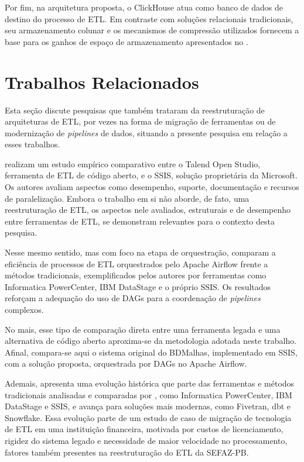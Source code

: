 Por fim, na arquitetura proposta, o ClickHouse atua como banco de dados de destino do processo de
ETL. Em contraste com soluções relacionais tradicionais, seu armazenamento colunar e os mecanismos
de compressão utilizados fornecem a base para os ganhos de espaço de armazenamento apresentados no
.

\section{Trabalhos Relacionados}

Esta seção discute pesquisas que também trataram da reestruturação de arquiteturas de ETL,
por vezes na forma de migração de ferramentas ou de modernização de \textit{pipelines} de
dados, situando a presente pesquisa em relação a esses trabalhos.

 realizam um estudo empírico comparativo entre o Talend Open
Studio, ferramenta de ETL de código aberto, e o SSIS, solução proprietária da Microsoft. Os
autores avaliam aspectos como desempenho, suporte, documentação e recursos de paralelização.
Embora o trabalho em si não aborde, de fato, uma reestruturação de ETL, os aspectos nele
avaliados, estruturais e de desempenho entre ferramentas de ETL, se demonstram relevantes para
o contexto desta pesquisa.

Nesse mesmo sentido, mas com foco na etapa de orquestração, 
comparam a eficiência de processos de ETL orquestrados pelo Apache Airflow frente a métodos
tradicionais, exemplificados pelos autores por ferramentas como Informatica PowerCenter, IBM
DataStage e o próprio SSIS. Os resultados reforçam a adequação do uso de DAGs 
para a coordenação de \textit{pipelines} complexos.

No mais, esse tipo de comparação direta entre uma ferramenta legada e uma alternativa de código aberto
aproxima-se da metodologia adotada neste trabalho. Afinal, compara-se aqui o sistema original
do BDMalhas, implementado em SSIS, com a solução proposta, orquestrada por DAGs no Apache Airflow.

Ademais,  apresenta uma evolução histórica que parte das ferramentas 
e métodos tradicionais analisadas e comparadas por , como Informatica PowerCenter, 
IBM DataStage e SSIS, e avança para soluções mais modernas, como Fivetran, dbt e Snowflake. 
Essa evolução parte de um estudo de caso de migração de tecnologia de ETL em uma instituição financeira, 
motivada por custos de licenciamento, rigidez do sistema legado e necessidade de maior velocidade no processamento, 
fatores também presentes na reestruturação do ETL da SEFAZ-PB.

